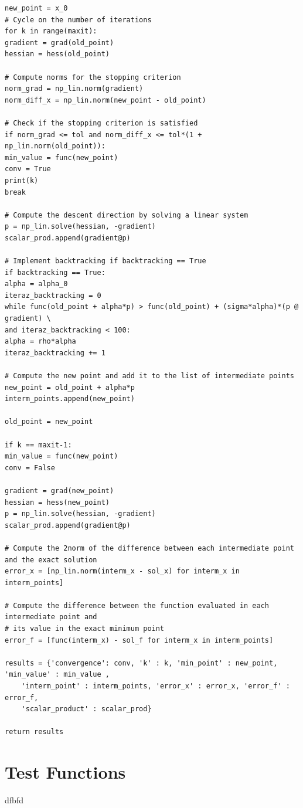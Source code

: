 \documentclass[a4paper,11pt]{article}
\begin{document}
\begin{verbatim}
new_point = x_0
# Cycle on the number of iterations
for k in range(maxit):
gradient = grad(old_point)
hessian = hess(old_point)

# Compute norms for the stopping criterion
norm_grad = np_lin.norm(gradient)
norm_diff_x = np_lin.norm(new_point - old_point)

# Check if the stopping criterion is satisfied
if norm_grad <= tol and norm_diff_x <= tol*(1 + np_lin.norm(old_point)):            
min_value = func(new_point)
conv = True
print(k)
break

# Compute the descent direction by solving a linear system
p = np_lin.solve(hessian, -gradient)
scalar_prod.append(gradient@p)

# Implement backtracking if backtracking == True
if backtracking == True:
alpha = alpha_0
iteraz_backtracking = 0 
while func(old_point + alpha*p) > func(old_point) + (sigma*alpha)*(p @ gradient) \
and iteraz_backtracking < 100:
alpha = rho*alpha
iteraz_backtracking += 1         

# Compute the new point and add it to the list of intermediate points
new_point = old_point + alpha*p
interm_points.append(new_point)

old_point = new_point

if k == maxit-1:
min_value = func(new_point)
conv = False

gradient = grad(new_point)
hessian = hess(new_point)
p = np_lin.solve(hessian, -gradient)
scalar_prod.append(gradient@p)

# Compute the 2norm of the difference between each intermediate point and the exact solution
error_x = [np_lin.norm(interm_x - sol_x) for interm_x in interm_points]

# Compute the difference between the function evaluated in each intermediate point and 
# its value in the exact minimum point
error_f = [func(interm_x) - sol_f for interm_x in interm_points]

results = {'convergence': conv, 'k' : k, 'min_point' : new_point, 'min_value' : min_value ,
	'interm_point' : interm_points, 'error_x' : error_x, 'error_f' : error_f,
	'scalar_product' : scalar_prod}

return results

\end{verbatim}


	\section{Test Functions}
	dfbfd
\end{document}
